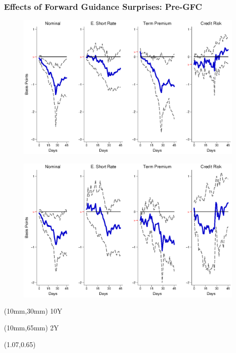 \documentclass[12pt, aspectratio=169, xcolor=dvipsnames]{beamer}
\begin{document}
\begin{frame}[label=FGEMpre]
\frametitle{Effects of Forward Guidance Surprises: Pre-GFC}
\begin{figure}[!htbp]
	\begin{center} %
		\includegraphics[trim={0cm 0cm 0cm 0cm},clip,height=0.45\textheight,width=0.85\linewidth]{../Figures/LPs/LagDep-FX/Path/EM/PathEMnomyptpphi120mPre.eps}
		\par\end{center}
\end{figure}
\vspace{-0.5cm}
\begin{figure}[!htbp]
	\begin{center} %
		\includegraphics[trim={0cm 0cm 0cm 0.76cm},clip,height=0.45\textheight,width=0.85\linewidth]{../Figures/LPs/LagDep-FX/Path/EM/PathEMnomyptpphi24mPre.eps}
		\par\end{center}
\end{figure}
\begin{textblock*}{8mm}(10mm,30mm)
	\small 10Y
\end{textblock*}
\begin{textblock*}{8mm}(10mm,65mm)
	\small 2Y
\end{textblock*}
\begin{textblock*}{5cm}(1.07\textwidth,0.65\textheight)
	\hyperlink{FGUSpre}{}
\end{textblock*}
\end{frame}
\end{document}
